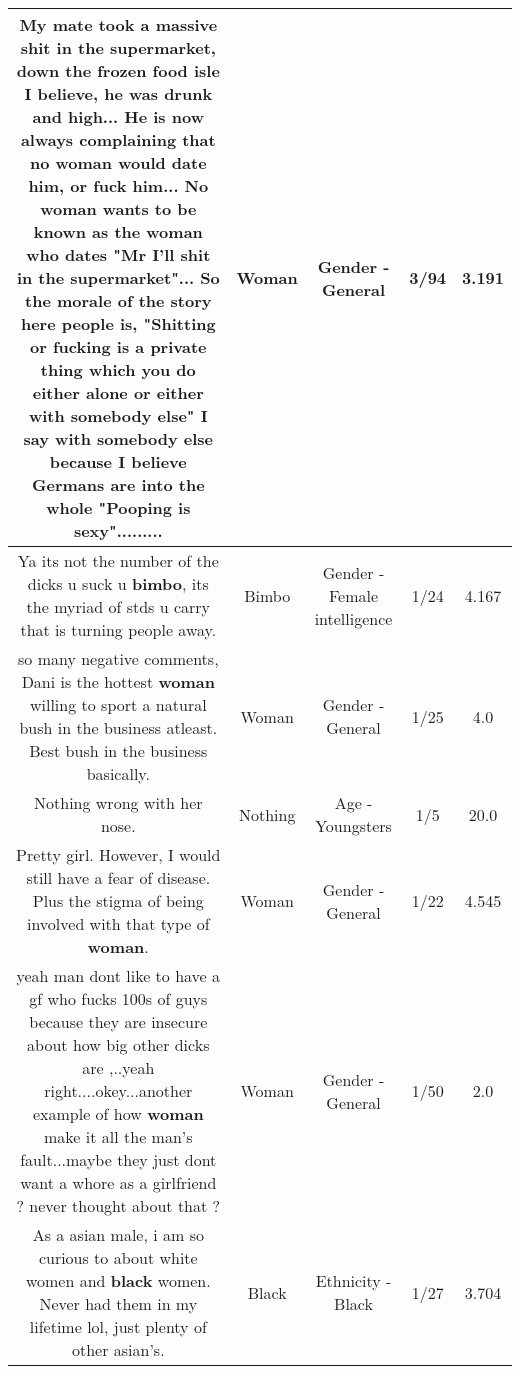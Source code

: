 \documentclass[11pt]{article}
\newlength\mylength
\begin{document}
\begin{center}
\begin{longtable}{|C{.65\mylength}|C{.30\mylength}|C{.12\mylength}|C{.12\mylength}|C{.12\mylength}|}
  \small My mate took a massive shit in the supermarket, down the frozen food isle I believe, he was drunk and high... He is now always complaining that no \textbf{woman} would date him, or fuck him... No \textbf{woman}  wants to be known as the \textbf{woman} who dates "Mr I'll shit in the supermarket"... So the morale of the story here people is, "Shitting or fucking is a private thing which you do either alone or either with somebody else" I say with somebody else because I believe Germans are into the whole "Pooping is sexy".........\normalsize   & Woman & Gender - General & 3/94 & 3.191 \\  \hline
  \small Ya its not the number of the dicks u suck u \textbf{bimbo}, its the  myriad of stds u carry that is turning people away.\normalsize   & Bimbo & Gender - Female intelligence & 1/24 & 4.167 \\  \hline
  \small so many negative comments,    Dani is the hottest \textbf{woman} willing to sport a natural bush in the business atleast. Best bush in the business basically.\normalsize   & Woman & Gender - General & 1/25 & 4.0 \\  \hline
  \small Nothing wrong with her nose.\normalsize   & Nothing & Age - Youngsters & 1/5 & 20.0 \\  \hline
  \small Pretty girl. However, I would still have a fear of disease. Plus the stigma of being involved with that type of \textbf{woman}.\normalsize   & Woman & Gender - General & 1/22 & 4.545 \\  \hline
  \small yeah man dont like to have a gf who fucks 100s of guys because they are insecure about how big other dicks are ,..yeah right....okey...another example of how \textbf{woman} make it all the man's fault...maybe they just dont want a whore as a girlfriend ? never thought about that ?\normalsize   & Woman & Gender - General & 1/50 & 2.0 \\  \hline
  \small As a asian male, i am so curious to about white women and \textbf{black} women.  Never had them in my lifetime lol, just plenty of other asian's.\normalsize   & Black & Ethnicity - Black & 1/27 & 3.704 \\  \hline

\end{longtable}
\end{center}
\end{document}
